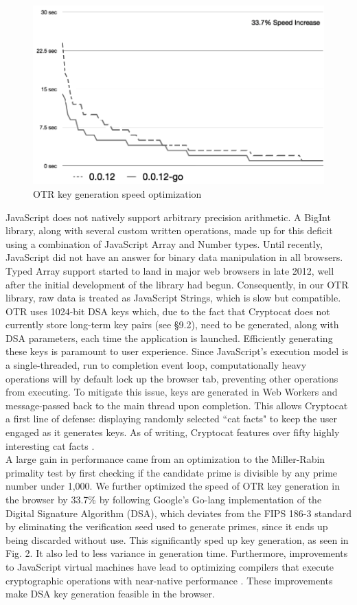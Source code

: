 \documentclass[letterpaper,twocolumn,10pt]{article}
\begin{document}
\begin{figure}[t]
\centering
\includegraphics[scale=0.25]{otr-go}
\caption{OTR key generation speed optimization}
\end{figure}
JavaScript does not natively support arbitrary precision arithmetic. A BigInt library, along with several custom written operations, made up for this deficit using a combination of JavaScript Array and Number types. Until recently, JavaScript did not have an answer for binary data manipulation in all browsers. Typed Array support started to land in major web browsers in late 2012, well after the initial development of the library had begun. Consequently, in our OTR library, raw data is treated as JavaScript Strings, which is slow but compatible. \\
OTR uses 1024-bit DSA keys which, due to the fact that Cryptocat does not currently store long-term key pairs (see \S9.2), need to be generated, along with DSA parameters, each time the application is launched. Efficiently generating these keys is paramount to user experience. Since JavaScript's execution model is a single-threaded, run to completion event loop, computationally heavy operations will by default lock up the browser tab, preventing other operations from executing. To mitigate this issue, keys are generated in Web Workers \cite{webworkers} and message-passed back to the main thread upon completion. This allows Cryptocat a first line of defense: displaying randomly selected ``cat facts" to keep the user engaged as it generates keys. As of writing, Cryptocat features over fifty highly interesting cat facts \cite{catfacts}. \\
A large gain in performance came from an optimization to the Miller-Rabin primality test by first checking if the candidate prime is divisible by any prime number under 1,000. We further optimized the speed of OTR key generation in the browser by 33.7\% by following Google's Go-lang implementation \cite{go-dsa} of the Digital Signature Algorithm (DSA), which deviates from the FIPS 186-3 \cite{dss} standard by eliminating the verification seed used to generate primes, since it ends up being discarded without use. This significantly sped up key generation, as seen in Fig. 2. It also led to less variance in generation time. Furthermore, improvements to JavaScript virtual machines have lead to optimizing compilers that execute cryptographic operations with near-native performance \cite{v8}. These improvements make DSA key generation feasible in the browser.
\end{document}
